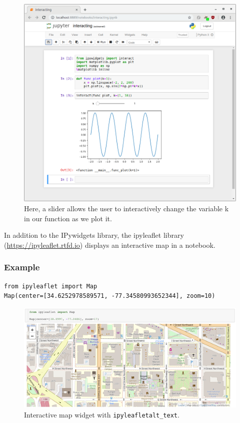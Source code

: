 \documentclass[]{book}
\begin{document}
\begin{figure}
\centering
\includegraphics{images/notebook-matplotlib-interact.png}
\caption{Here, a slider allows the user to interactively change the
variable k in our function as we plot it.}
\end{figure}

In addition to the IPywidgets library, the ipyleaflet library
(\url{https://ipyleaflet.rtfd.io}) displays an interactive map in a
notebook.

\subsubsection*{Example}\label{example}

\begin{verbatim}
from ipyleaflet import Map
Map(center=[34.6252978589571, -77.34580993652344], zoom=10)
\end{verbatim}

\begin{figure}
\centering
\includegraphics{images/chapter52.png}
\caption{Interactive map widget with \texttt{ipyleafletalt\_text}.}
\end{figure}
\end{document}
